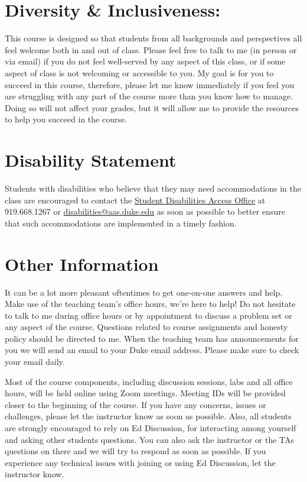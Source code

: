 \documentclass[11pt, a4paper]{article}
\begin{document}
\section{Diversity \& Inclusiveness:}
This course is designed so that students from all backgrounds and perspectives all feel welcome both in and out of class. Please feel free to talk to me (in person or via email) if you do not feel well-served by any aspect of this class, or if some aspect of class is not welcoming or accessible to you. My goal is for you to succeed in this course, therefore, please let me know immediately if you feel you are struggling with any part of the course more than you know how to manage. Doing so will not affect your grades, but it will allow me to provide the resources to help you succeed in the course.


\section{Disability Statement} 
Students with disabilities who believe that they may need accommodations in the class are encouraged to contact the \href{https://access.duke.edu/students/staff.php}{Student Disabilities Access Office} at 919.668.1267 or \href{mailto:disabilities@aas.duke.edu}{disabilities@aas.duke.edu}  as soon as possible to better ensure that such accommodations are implemented in a timely fashion.


\section{Other Information} 
It can be a lot more pleasant oftentimes to get one-on-one answers and help. Make use of the teaching team's office hours, we're here to help! Do not hesitate to talk to me during office hours or by appointment to discuss a problem set or any aspect of the course.  Questions related to course assignments and honesty policy should be directed to me. When the teaching team has announcements for you we will send an email to your Duke email address. Please make sure to check your email daily.

Most of the course components, including discussion sessions, labs and all office hours, will be held online using Zoom meetings. Meeting IDs will be provided closer to the beginning of the course. If you have any concerns, issues or challenges, please let the instructor know as soon as possible. Also, all students are strongly encouraged to rely on Ed Discussion, for interacting among yourself and asking other students questions. You can also ask the instructor or the TAs questions on there and we will try to respond as soon as possible.  If you experience any technical issues with joining or using Ed Discussion, let the instructor know.
\end{document}
